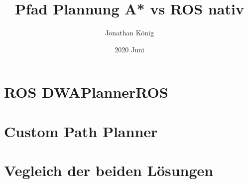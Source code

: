 \documentclass{article}
\title{Pfad Plannung A* vs ROS nativ}
\date{2020 Juni}
\author{Jonathan König}
\begin{document}
\maketitle
\newpage

\tableofcontents

\newpage
\clearpage
{}
\section{ROS DWAPlannerROS}



\section{Custom Path Planner}

\section{Vegleich der beiden Lösungen}
\end{document}
